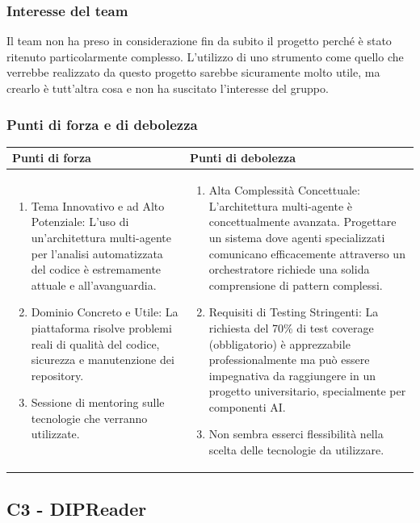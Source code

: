 \documentclass[a4paper,11pt]{article}
\begin{document}
\subsubsection{Interesse del team}
Il team non ha preso in considerazione fin da subito il progetto perché è stato ritenuto particolarmente complesso. L'utilizzo di uno strumento come quello che verrebbe realizzato da questo progetto sarebbe sicuramente molto utile, ma crearlo è tutt'altra cosa e non ha suscitato l'interesse del gruppo.
\subsubsection{Punti di forza e di debolezza}
{\footnotesize
\begin{tabularx}{\textwidth}{|X|X|}
\hline
\rowcolor{lightgray!40} %
\textbf{Punti di forza} & \textbf{Punti di debolezza} \\
\hline
\begin{enumerate}
\item Tema Innovativo e ad Alto Potenziale: L'uso di un'architettura multi-agente per l'analisi automatizzata del codice è estremamente attuale e all'avanguardia.
\item Dominio Concreto e Utile: La piattaforma risolve problemi reali di qualità del codice, sicurezza e manutenzione dei repository. 
\item Sessione di mentoring sulle tecnologie che verranno utilizzate.
\end{enumerate}
 & \begin{enumerate}
\item Alta Complessità Concettuale: L'architettura multi-agente è concettualmente avanzata. Progettare un sistema dove agenti specializzati comunicano efficacemente attraverso un orchestratore richiede una solida comprensione di pattern complessi.
\item Requisiti di Testing Stringenti: La richiesta del 70\% di test coverage (obbligatorio) è apprezzabile professionalmente ma può essere impegnativa da raggiungere in un progetto universitario, specialmente per componenti AI.
\item Non sembra esserci flessibilità nella scelta delle tecnologie da utilizzare.
\end{enumerate} \\
\hline
\end{tabularx}
}

\newpage
\subsection{C3 - DIPReader}
\end{document}
